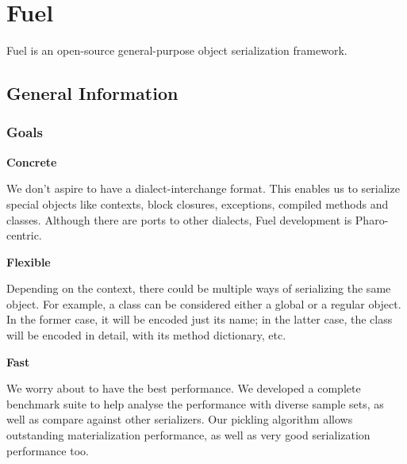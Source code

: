 \documentclass[a4paper,10pt,twoside]{book}
\begin{document}
\fi
\sloppy
\chapter{Fuel}

Fuel is an open-source general-purpose object serialization framework.

\section{General Information}

\subsection{Goals}

\begin{list}{}{}
\item\hspace{-\labelwidth}\textbf{ Concrete }
\item  We don't aspire to have a dialect-interchange format. This enables us to serialize special objects like contexts, block closures, exceptions, compiled methods and classes. Although there are ports to other dialects, Fuel development is Pharo-centric.
\end{list}

\begin{list}{}{}
\item\hspace{-\labelwidth}\textbf{ Flexible}
\item  Depending on the context, there could be multiple ways of serializing the same object. For example, a class can be considered either a global or a regular object. In the former case, it will be encoded just its name; in the latter case, the class will be encoded in detail, with its method dictionary, etc.
\end{list}

\begin{list}{}{}
\item\hspace{-\labelwidth}\textbf{ Fast }
\item  We worry about to have the best performance. We developed a complete benchmark suite to help analyse the performance with diverse sample sets, as well as compare against other serializers. Our pickling algorithm allows outstanding materialization performance, as well as very good serialization performance too.
\end{list}
\end{document}
